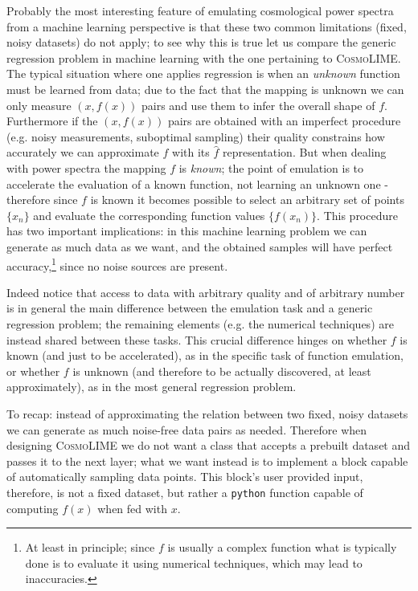 Probably the most interesting feature of emulating cosmological power spectra from a machine learning perspective is that these two common limitations (fixed, noisy datasets) do not apply; to see why this is true let us compare the generic regression problem in machine learning with the one pertaining to \textsc{CosmoLIME}.
The typical situation where one applies regression is when an \emph{unknown} function must be learned from data; due to the fact that the mapping is unknown we can only measure $(x, f(x))$ pairs and use them to infer the overall shape of $f$. Furthermore if the $(x, f(x))$ pairs are obtained with an imperfect procedure (e.g. noisy measurements, suboptimal sampling) their quality constrains how accurately we can approximate $f$ with its $\hat{f}$ representation.
But when dealing with power spectra the mapping $f$ is \emph{known}; the point of emulation is to accelerate the evaluation of a known function, not learning an unknown one - therefore since $f$ is known it becomes possible to select an arbitrary set of points $\{x_n\}$ and evaluate the corresponding function values $\{f(x_n)\}$. This procedure has two important implications: in this machine learning problem we can generate as much data as we want, and the obtained samples will have perfect accuracy,\footnote{At least in principle; since $f$ is usually a complex function what is typically done is to evaluate it using numerical techniques, which may lead to inaccuracies.} since no noise sources are present.

Indeed notice that access to data with arbitrary quality and of arbitrary number is in general the main difference between the emulation task and a generic regression problem; the remaining elements (e.g. the numerical techniques) are instead shared between these tasks. This crucial difference hinges on whether $f$ is known (and just to be accelerated), as in the specific task of function emulation, or whether $f$ is unknown (and therefore to be actually discovered, at least approximately), as in the most general regression problem.

To recap: instead of approximating the relation between two fixed, noisy datasets we can generate as much noise-free data pairs as needed. Therefore when designing \textsc{CosmoLIME} we do not want a class that accepts a prebuilt dataset and passes it to the next layer; what we want instead is to implement a block capable of automatically sampling data points. This block's user provided input, therefore, is not a fixed dataset, but rather a \texttt{python} function capable of computing $f(x)$ when fed with $x$. 

